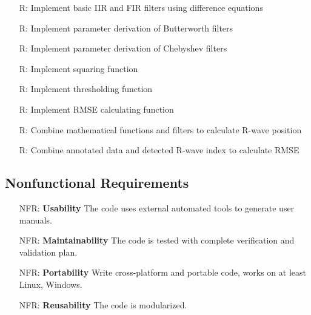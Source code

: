 \documentclass[12pt]{article}
\begin{document}
\noindent \begin{itemize}

\item[R\refstepcounter{reqnum}\thereqnum \label{R_basic_filters}:] Implement
basic IIR and FIR filters using difference equations

\item[R\refstepcounter{reqnum}\thereqnum \label{R_Butterworth}:] Implement
parameter derivation of Butterworth filters

\item[R\refstepcounter{reqnum}\thereqnum \label{R_Chebyshev}:] Implement
parameter derivation of Chebyshev filters

\item[R\refstepcounter{reqnum}\thereqnum \label{R_squaring}:] Implement squaring
function

\item[R\refstepcounter{reqnum}\thereqnum \label{R_thresholding}:] Implement
thresholding function

\item[R\refstepcounter{reqnum}\thereqnum \label{R_RMSE}:] Implement RMSE
calculating function

\item[R\refstepcounter{reqnum}\thereqnum \label{R_R_wave_position}:] Combine
mathematical functions and filters to calculate R-wave position

\item[R\refstepcounter{reqnum}\thereqnum \label{R_cal_RMSE}:] Combine annotated
data and detected R-wave index to calculate RMSE

\end{itemize}


\subsection{Nonfunctional Requirements}

\noindent \begin{itemize}

\item[NFR\refstepcounter{nfrnum}\thenfrnum \label{NFR_Usability}:]
  \textbf{Usability} The code uses external automated tools to generate user
  manuals.

\item[NFR\refstepcounter{nfrnum}\thenfrnum \label{NFR_Maintainability}:]
  \textbf{Maintainability} The code is tested with complete verification and
  validation plan.

\item[NFR\refstepcounter{nfrnum}\thenfrnum \label{NFR_Portability}:]
  \textbf{Portability} Write cross-platform and portable code, works on at least
  Linux, Windows.

\item[NFR\refstepcounter{nfrnum}\thenfrnum \label{NFR_Reusability}:]
  \textbf{Reusability} The code is modularized.

\end{itemize}
\end{document}
